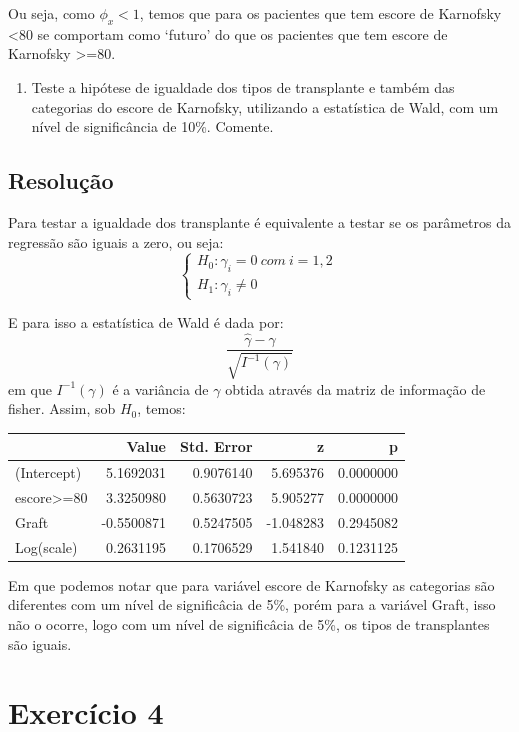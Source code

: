 \documentclass[]{article}
\providecommand{\tightlist}{%
  \setlength{\itemsep}{0pt}\setlength{\parskip}{0pt}}
\begin{document}
Ou seja, como \(\phi_x<1\), temos que para os pacientes que tem escore
de Karnofsky \textless{}80 se comportam como `futuro' do que os
pacientes que tem escore de Karnofsky \textgreater{}=80.

\begin{enumerate}
\def\labelenumi{(\alph{enumi})}
\setcounter{enumi}{3}
\tightlist
\item
  Teste a hipótese de igualdade dos tipos de transplante e também das
  categorias do escore de Karnofsky, utilizando a estatística de Wald,
  com um nível de significância de 10\%. Comente.
\end{enumerate}

\subsection{Resolução}\label{resolucao-8}

Para testar a igualdade dos transplante é equivalente a testar se os
parâmetros da regressão são iguais a zero, ou seja:
\[ \left\{ \begin{array}{ll}
H_0: \gamma_i=0 \ com \ i=1,2 \\
H_1: \gamma_i \ne 0  \end{array} \right.\ \]

E para isso a estatística de Wald é dada por:
\[\frac{\hat\gamma-\gamma}{\sqrt{I^{-1}(\gamma)}}\] em que
\(I^{-1}(\gamma)\) é a variância de \(\gamma\) obtida através da matriz
de informação de fisher. Assim, sob \(H_0\), temos:

\begin{longtable}[]{@{}lrrrr@{}}
\toprule
& Value & Std. Error & z & p\tabularnewline
\midrule
\endhead
(Intercept) & 5.1692031 & 0.9076140 & 5.695376 &
0.0000000\tabularnewline
escore\textgreater{}=80 & 3.3250980 & 0.5630723 & 5.905277 &
0.0000000\tabularnewline
Graft & -0.5500871 & 0.5247505 & -1.048283 & 0.2945082\tabularnewline
Log(scale) & 0.2631195 & 0.1706529 & 1.541840 & 0.1231125\tabularnewline
\bottomrule
\end{longtable}

Em que podemos notar que para variável escore de Karnofsky as categorias
são diferentes com um nível de significâcia de 5\%, porém para a
variável Graft, isso não o ocorre, logo com um nível de significâcia de
5\%, os tipos de transplantes são iguais.

\section{Exercício 4}\label{exercicio-4}
\end{document}
